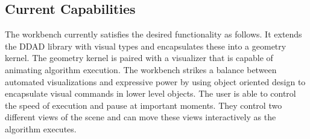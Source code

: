 \subsection{Current Capabilities}

The workbench currently satisfies the desired functionality as follows. It
extends the DDAD library with visual types and encapsulates these into a
geometry kernel. The geometry kernel is paired with a visualizer that is capable
of animating algorithm execution. The workbench strikes a balance between
automated visualizations and expressive power by using object
oriented design to encapsulate visual commands in lower level objects. The user
is able to control the speed of execution and pause at important moments. They
control two different views of the scene and can move these views interactively
as the algorithm executes.
